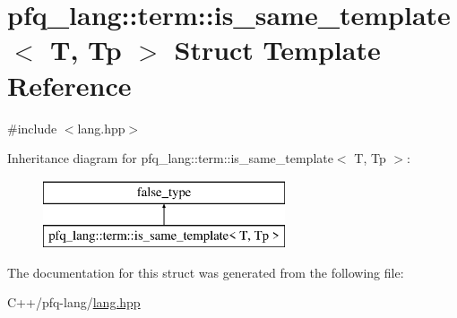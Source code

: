 \hypertarget{structpfq__lang_1_1term_1_1is__same__template}{\section{pfq\-\_\-lang\-:\-:term\-:\-:is\-\_\-same\-\_\-template$<$ T, Tp $>$ Struct Template Reference}
\label{structpfq__lang_1_1term_1_1is__same__template}
}


{\ttfamily \#include $<$lang.\-hpp$>$}

Inheritance diagram for pfq\-\_\-lang\-:\-:term\-:\-:is\-\_\-same\-\_\-template$<$ T, Tp $>$\-:\begin{figure}[H]
\begin{center}
\leavevmode
\includegraphics[height=2.000000cm]{structpfq__lang_1_1term_1_1is__same__template}
\end{center}
\end{figure}


The documentation for this struct was generated from the following file\-:\begin{DoxyCompactItemize}
\item 
C++/pfq-\/lang/\hyperlink{lang_8hpp}{lang.\-hpp}\end{DoxyCompactItemize}

